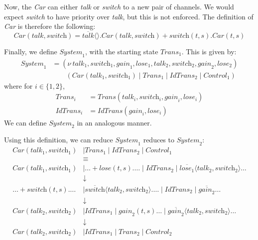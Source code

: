 \documentclass[a4paper, openany]{memoir}
\theoremstyle{definition}
\begin{document}
    Now, the \textit{Car} can either \textit{talk} or \textit{switch} to a new pair of channels. We would expect \textit{switch} to have priority over \textit{talk}, but this is not enforced. The definition of \textit{Car} is therefore the following:
    \[\textit{Car}(\textit{talk}, \textit{switch}) = \overline{\textit{talk}}\langle \rangle.\textit{Car} (\textit{talk}, \textit{switch}) + \textit{switch} (t, s).\textit{Car}(t, s)\]

    Finally, we define $\textit{System}_1$, with the starting state $\textit{Trans}_1$. This is given by:
    \begin{align*}
        \textit{System}_1 &= (\nu \ \textit{talk}_1, \textit{switch}_1, \textit{gain}_1, \textit{lose}_1, \textit{talk}_2, \textit{switch}_2, \textit{gain}_2, \textit{lose}_2) \\
        &\qquad (\textit{Car}(\textit{talk}_1, \textit{switch}_1) \mid \textit{Trans}_1 \mid \textit{IdTrans}_2 \mid \textit{Control}_1)
    \end{align*}
    where for $i \in \{1, 2\}$,
    \begin{align*}
        \textit{Trans}_i &= \textit{Trans}(\textit{talk}_i, \textit{switch}_i, \textit{gain}_i, \textit{lose}_i) \\
        \textit{IdTrans}_i &= \textit{IdTrans}(\textit{gain}_i, \textit{lose}_i) 
    \end{align*}
    We can define $\textit{System}_2$ in an analogous manner.

    Using this definition, we can reduce $\textit{System}_1$ reduces to $\textit{System}_2$:
    \begin{align*}
        \textit{Car}(\textit{talk}_1, \textit{switch}_1) &\mid \textit{Trans}_1 \mid \textit{IdTrans}_2 \mid \textit{Control}_1 \\
        &\equiv \\
        \textit{Car}(\textit{talk}_1, \textit{switch}_1) &\mid \dots + \textit{lose}(t, s).\dots \mid \textit{IdTrans}_2 \mid \overline{\textit{lose}_1} \langle \textit{talk}_2, \textit{switch}_2 \rangle \dots \\
        &\downarrow \\
        \dots + \textit{switch}(t, s).\dots &\mid \overline{\textit{switch}} \langle \textit{talk}_2, \textit{switch}_2 \rangle.\dots \mid \textit{IdTrans}_2 \mid \overline{\textit{gain}_2} \dots \\
        &\downarrow \\
        \textit{Car}(\textit{talk}_2, \textit{switch}_2) &\mid \textit{IdTrans}_1 \mid \textit{gain}_2(t, s)\dots \mid \overline{\textit{gain}_2} \langle \textit{talk}_2, \textit{switch}_2 \rangle \dots \\
        &\downarrow \\
        \textit{Car}(\textit{talk}_2, \textit{switch}_2) &\mid \textit{IdTrans}_1 \mid \textit{Trans}_2 \mid \textit{Control}_2
    \end{align*}
\end{document}
